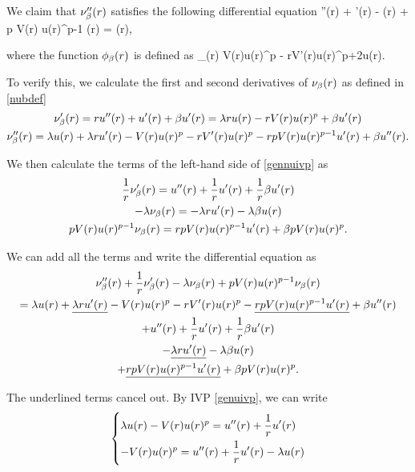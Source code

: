 We claim that $\nu_{\beta}''(r)$ satisfies the following differential equation
\be \label{gennuivp}
    \nub''(r) +  \nub'(r) - \lambda \nub(r) + p V(r) u(r)^{p-1}
    \nub(r) = \phib(r),
\ee

where the function $\phi_{\beta}(r)$ is defined as
\be \label{phibdef}
\phi_{\beta}(r) \coloneqq {} V(r)u(r)^p - 
rV'(r)u(r)^p+2\lambda u(r).
\ee

To verify this, we calculate the first and second derivatives of $\nu_{\beta}(r)$ as
defined in \eqref{nubdef}
\begin{gather*}
    \nu_{\beta}'(r) = ru''(r) + u'(r) + \beta u'(r) =
        \lambda r u(r) - r V(r) u(r)^p + \beta u'(r)\\
    \nu_{\beta}''(r) = \lambda u(r) + \lambda r u'(r) - V(r) u(r)^p
    - r V'(r) u(r)^p - r p V(r) u(r)^{p-1} u'(r) + \beta u''(r).
\end{gather*}

We then calculate the terms of the left-hand side of \eqref{gennuivp} as
\begin{gather*}
    \frac{1}{r} \nu_{\beta}'(r) = u''(r) + \frac{1}{r} u'(r) + \frac{1}{r} \beta
    u'(r)\\
    - \lambda \nu_{\beta}(r) = - \lambda r u'(r) - \lambda \beta u(r)\\
    p V(r) u(r)^{p-1} \nu_{\beta}(r) = r p V(r) u(r)^{p-1} u'(r) + \beta p V(r) u(r)^p.
\end{gather*}

We can add all the terms and write the differential equation as
\begin{multline}
    \nu_{\beta}''(r) + \frac{1}{r} \nu_{\beta}'(r) - \lambda \nu_{\beta}(r) + p V(r) u(r)^{p-1}
    \nu_{\beta}(r) \\
    = \lambda u(r) + \underline{\lambda r u'(r)} - V(r) u(r)^p
    - r V'(r) u(r)^p - \underline{r p V(r) u(r)^{p-1} u'(r)} + \beta u''(r)\\
    + u''(r) + \frac{1}{r} u'(r) + \frac{1}{r} \beta u'(r)\\
    - \underline{\lambda r u'(r)} - \lambda \beta u(r)\\
    + \underline{r p V(r) u(r)^{p-1} u'(r)} + \beta p V(r) u(r)^p.
\end{multline}

The underlined terms cancel out. By IVP \eqref{genuivp}, we can write 
\[ \begin{dcases}
    \lambda u(r) - V(r) u(r)^p = u''(r) + \frac{1}{r} u'(r)\\
    - V(r) u(r)^p = u''(r) + \frac{1}{r} u'(r) - \lambda u(r) 
\end{dcases}\]

